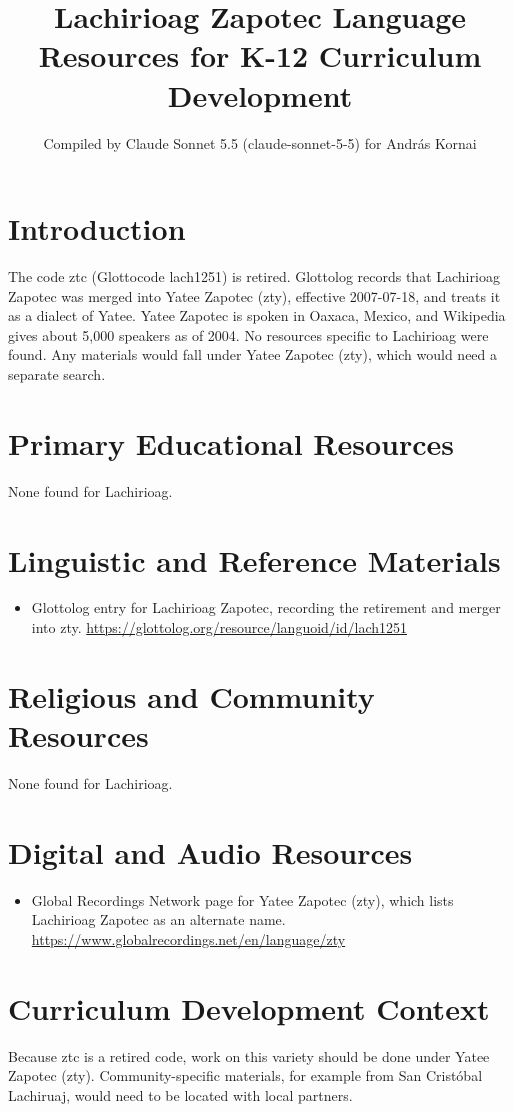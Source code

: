 \documentclass[12pt]{article}
\title{Lachirioag Zapotec Language Resources for K-12 Curriculum Development}
\author{Compiled by Claude Sonnet 5.5 (claude-sonnet-5-5) for Andr\'as Kornai}
\date{}
\begin{document}
\maketitle

\section{Introduction}
The code ztc (Glottocode lach1251) is retired. Glottolog records that Lachirioag Zapotec was merged into Yatee Zapotec (zty), effective 2007-07-18, and treats it as a dialect of Yatee. Yatee Zapotec is spoken in Oaxaca, Mexico, and Wikipedia gives about 5,000 speakers as of 2004. No resources specific to Lachirioag were found. Any materials would fall under Yatee Zapotec (zty), which would need a separate search.

\section{Primary Educational Resources}
None found for Lachirioag.

\section{Linguistic and Reference Materials}
\begin{itemize}
\item Glottolog entry for Lachirioag Zapotec, recording the retirement and merger into zty. \url{https://glottolog.org/resource/languoid/id/lach1251}
\end{itemize}

\section{Religious and Community Resources}
None found for Lachirioag.

\section{Digital and Audio Resources}
\begin{itemize}
\item Global Recordings Network page for Yatee Zapotec (zty), which lists Lachirioag Zapotec as an alternate name. \url{https://www.globalrecordings.net/en/language/zty}
\end{itemize}

\section{Curriculum Development Context}
Because ztc is a retired code, work on this variety should be done under Yatee Zapotec (zty). Community-specific materials, for example from San Crist\'obal Lachiruaj, would need to be located with local partners.
\end{document}
